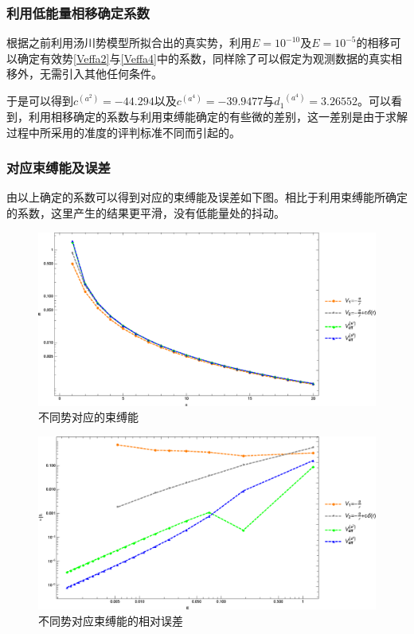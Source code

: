 \documentclass[hyperref,cs4size,titlepage,twoside]{ctexart}
\begin{document}
\subsubsection{利用低能量相移确定系数}
根据之前利用汤川势模型所拟合出的真实势，利用$E=10^{-10}$及$E=10^{-5}$的相移可以确定有效势\eqref{Veffa2}与\eqref{Veffa4}中的系数，同样除了可以假定为观测数据的真实相移外，无需引入其他任何条件。

于是可以得到$c^{(a^2)}=-44.294$以及$c^{(a^4)}=-39.9477$与${d_1}^{(a^4)}=3.26552$。可以看到，利用相移确定的系数与利用束缚能确定的有些微的差别，这一差别是由于求解过程中所采用的准度的评判标准不同而引起的。
\subsubsection{对应束缚能及误差}
由以上确定的系数可以得到对应的束缚能及误差如下图。相比于利用束缚能所确定的系数，这里产生的结果更平滑，没有低能量处的抖动。
\clearpage
\begin{figure}[!htbp]
  \centering
  \includegraphics[width=6in]{Test_PS_CurveFitting_Figure2_1.eps}
  \caption{不同势对应的束缚能}
\end{figure}
\begin{figure}[!htbp]
  \centering
  \includegraphics[width=6in]{Test_PS_CurveFitting_Figure2.eps}
  \caption{不同势对应束缚能的相对误差}
\end{figure}
\end{document}
